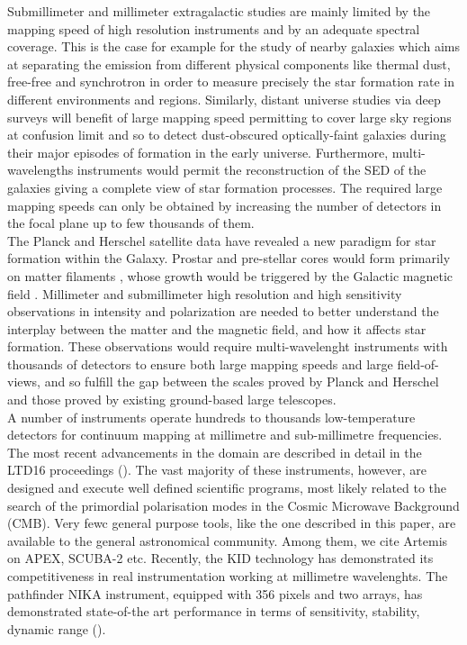 \documentclass[]{aa} %
\begin{document}
Submillimeter and millimeter extragalactic studies are mainly limited by the mapping speed of high resolution instruments and by an adequate spectral coverage. This is the case for example for the study of nearby galaxies which aims at separating the emission from different physical components like thermal dust, free-free and synchrotron in order to measure precisely the star formation rate in different environments and regions. Similarly, distant universe studies via deep surveys will benefit of large mapping speed permitting to cover large sky regions at confusion limit and so to detect dust-obscured optically-faint galaxies during their major episodes of formation in the early universe. Furthermore, multi-wavelengths instruments would permit the reconstruction of the SED of the galaxies giving a complete view of star formation processes. The required large mapping speeds can only be obtained by increasing the number of detectors in the focal plane up to few thousands of them. \\

The Planck \cite{} and Herschel \cite{} satellite data have revealed a new paradigm for star formation within the Galaxy. Prostar and pre-stellar cores would form primarily on matter filaments \cite{}, whose growth would  be triggered by the Galactic magnetic field \cite{}. Millimeter and submillimeter high resolution and high sensitivity observations in intensity and polarization are needed to better understand the interplay between the matter and the magnetic field, and how it affects star formation. These observations would require multi-wavelenght instruments with thousands of detectors to ensure both large mapping speeds and large field-of-views, and so fulfill the gap between the scales proved by Planck and Herschel and those proved by existing ground-based large telescopes. \\

A number of instruments operate hundreds to thousands low-temperature detectors for continuum mapping at millimetre and sub-millimetre frequencies. The most recent advancements in the domain are described in detail in the LTD16 proceedings (\cite{ltd16:2016}). The vast majority of these instruments, however, are designed and execute well defined scientific programs, most likely related to the search of the primordial polarisation modes in the Cosmic Microwave Background (CMB). Very fewc general purpose tools, like the one described in this paper, are available to the general astronomical community. Among them, we cite Artemis on APEX, SCUBA-2 etc. Recently, the KID technology has demonstrated its competitiveness in real instrumentation working at millimetre wavelenghts. The pathfinder NIKA instrument, equipped with 356 pixels and two arrays, has demonstrated state-of-the art performance in terms of sensitivity, stability, dynamic range (\cite{Catalano2014, Monfardini2011, Adam2014}).
\end{document}
